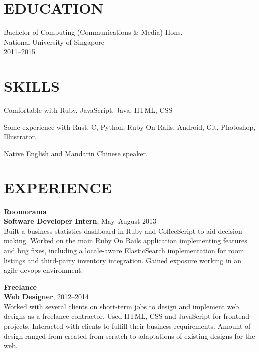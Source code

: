 \documentclass[line, margin]{res}
\makeatletter
\newcommand{\at}[0]{@}
\makeatother
\begin{document}
\address{
    \href{mailto:ng.guoyou+cv\at gmail.com}{ng.guoyou\at gmail.com}
    \href{http://github.com/gyng}{http://github.com/gyng}
}

\begin{resume}
    \section{EDUCATION}
        Bachelor of Computing (Communications \& Media) Hons. \\
        National University of Singapore \\
        2011--2015

    \section{SKILLS}
        Comfortable with Ruby, JavaScript, Java, HTML, CSS

        Some experience with Rust, C, Python, Ruby On Rails, Android, Git, Photoshop, Illustrator.

        Native English and Mandarin Chinese speaker.

    \section{EXPERIENCE}
        \textbf{Roomorama} \\
        \textbf{Software Developer Intern}, May--August 2013 \\
        Built a business statistics dashboard in Ruby and CoffeeScript to aid decision-making. Worked on the main Ruby On Rails application implementing features and bug fixes, including a locale-aware ElasticSearch implementation for room listings and third-party inventory integration. Gained exposure working in an agile devops environment.

        \textbf{Freelance} \\
        \textbf{Web Designer}, 2012--2014 \\
        Worked with several clients on short-term jobs to design and implement web designs as a freelance contractor. Used HTML, CSS and JavaScript for frontend projects. Interacted with clients to fulfill their business requirements. Amount of design ranged from created-from-scratch to adaptations of existing designs for the web.


\end{resume}
\end{document}
